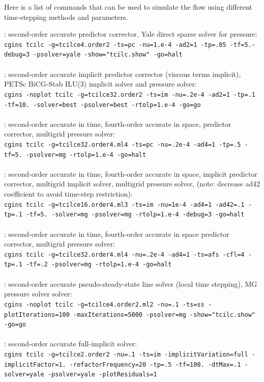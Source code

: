 \documentclass{article}
\begin{document}
Here is a list of commands that can be used to simulate the flow using different time-stepping methods and parameters.
\begin{flushleft}
 : second-order accurate predictor corrector, Yale direct sparse solver for pressure:\\
{\tt cgins tcilc -g=tcilce4.order2 -ts=pc -nu=1.e-4 -ad2=1 -tp=.05 -tf=5.-debug=3 -psolver=yale -show="tcilc.show" -go=halt}\\
 ~~ \\
%
 : second-order accurate implicit predictor corrector (viscous terms implicit), PETSc BiCG-Stab ILU(3) implicit solver and pressure solver:\\
{\tt cgins -noplot tcilc -g=tcilce32.order2 -ts=im -nu=.2e-4 -ad2=1 -tp=.1 -tf=10. -solver=best -psolver=best -rtolp=1.e-4 -go=go}\\
~~  \\
%
 : second-order accurate in time, fourth-order accurate in space, predictor corrector, multigrid pressure
solver:\\
{\tt cgins tcilc -g=tcilce32.order4.ml4 -ts=pc -nu=.2e-4 -ad4=1 -tp=.5 -tf=5. -psolver=mg -rtolp=1.e-4 -go=halt}\\
~~  \\
%
 : second-order accurate in time, fourth-order accurate in space, implicit predictor corrector, multigrid implicit solver, multigrid pressure
solver, (note: decrease ad42 coefficient to avoid time-step restriction):\\
{\tt cgins tcilc -g=tcilce16.order4.ml3 -ts=im -nu=1e-4 -ad4=1 -ad42=.1 -tp=.1 -tf=5. -solver=mg -psolver=mg -rtolp=1.e-4 -debug=3 -go=halt}\\
~~  \\
%
 : second-order accurate in time, fourth-order accurate in space predictor corrector, multigrid pressure
solver:\\
{\tt cgins tcilc -g=tcilce32.order4.ml4 -nu=.2e-4 -ad4=1 -ts=afs -cfl=4 -tp=.1 -tf=.2 -psolver=mg -rtolp=1.e-4 -go=halt}\\
~~  \\
%
 : second-order accurate pseudo-steady-state line solver (local time stepping), MG pressure solver
solver:\\
{\tt cgins -noplot tcilc -g=tcilce4.order2.ml2 -nu=.1 -ts=ss -plotIterations=100 -maxIterations=5000 -psolver=mg -show="tcilc.show" -go=go} \\
~~  \\
%
 : second-order accurate full-implicit solver:\\
{\tt cgins tcilc -g=tcilce2.order2 -nu=.1 -ts=im -implicitVariation=full -implicitFactor=1. -refactorFrequency=20 -tp=.5 -tf=100. -dtMax=.1 -solver=yale -psolver=yale -plotResiduals=1}
\end{flushleft}
\end{document}
